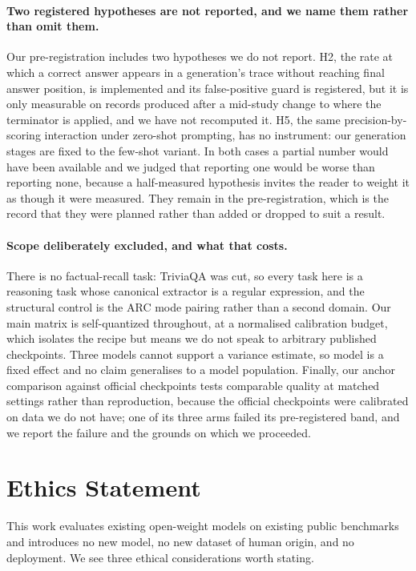 \documentclass[11pt]{article}
\begin{document}
\paragraph{Two registered hypotheses are not reported, and we name them rather than omit them.}
Our pre-registration includes two hypotheses we do not report. H2, the rate at
which a correct answer appears in a generation's trace without reaching final
answer position, is implemented and its false-positive guard is registered, but it
is only measurable on records produced after a mid-study change to where the
terminator is applied, and we have not recomputed it. H5, the same
precision-by-scoring interaction under zero-shot prompting, has no instrument: our
generation stages are fixed to the few-shot variant. In both cases a partial
number would have been available and we judged that reporting one would be worse
than reporting none, because a half-measured hypothesis invites the reader to
weight it as though it were measured. They remain in the pre-registration, which
is the record that they were planned rather than added or dropped to suit a result.

\paragraph{Scope deliberately excluded, and what that costs.}
There is no factual-recall task: TriviaQA was cut, so every task here is a
reasoning task whose canonical extractor is a regular expression, and the
structural control is the ARC mode pairing rather than a second domain. Our main
matrix is self-quantized throughout, at a normalised calibration budget, which
isolates the recipe but means we do not speak to arbitrary published checkpoints.
Three models cannot support a variance estimate, so model is a fixed effect and no
claim generalises to a model population. Finally, our anchor comparison against
official checkpoints tests comparable quality at matched settings rather than
reproduction, because the official checkpoints were calibrated on data we do not
have; one of its three arms failed its pre-registered band, and we report the
failure and the grounds on which we proceeded.

\section*{Ethics Statement}
\label{sec:ethics}

This work evaluates existing open-weight models on existing public benchmarks
and introduces no new model, no new dataset of human origin, and no deployment.
We see three ethical considerations worth stating.
\end{document}

